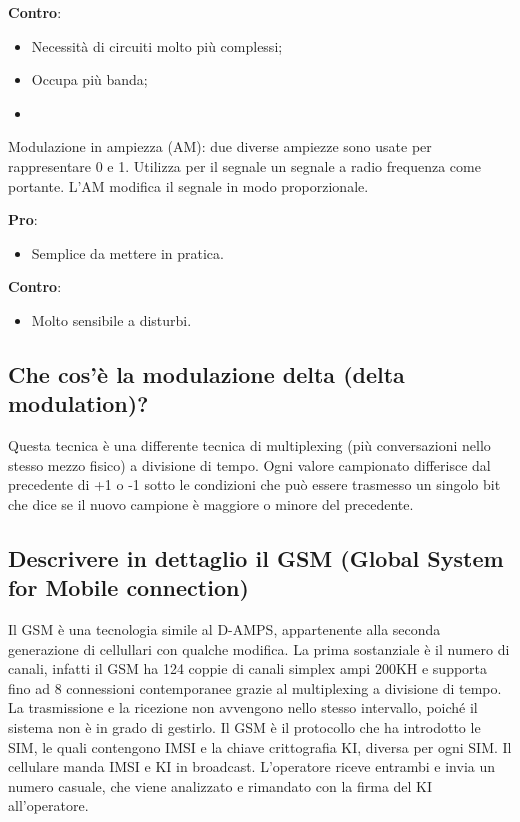 \textbf{Contro}:

\begin{itemize}

\item Necessità di circuiti molto più complessi;
\item Occupa più banda;
\item 

\end{itemize}

Modulazione in ampiezza (AM): due diverse ampiezze sono usate per rappresentare 0 e 1. Utilizza
per il segnale un segnale a radio frequenza come portante. L’AM modifica il segnale in modo
proporzionale.

\textbf{Pro}:

\begin{itemize}

\item Semplice da mettere in pratica.

\end{itemize}

\textbf{Contro}:

\begin{itemize}

\item Molto sensibile a disturbi.

\end{itemize}

\subsection{Che cos'è la modulazione delta (delta modulation)?}

Questa tecnica è una differente tecnica di multiplexing (più conversazioni nello stesso mezzo fisico)
a divisione di tempo. Ogni valore campionato differisce dal precedente di +1 o -1 sotto le condizioni
che può essere trasmesso un singolo bit che dice se il nuovo campione è maggiore o minore del
precedente.

\subsection{Descrivere in dettaglio il GSM (Global System for Mobile connection)}

Il GSM è una tecnologia simile al D-AMPS, appartenente alla seconda generazione di cellullari con
qualche modifica. La prima sostanziale è il numero di canali, infatti il GSM ha 124 coppie di canali
simplex ampi 200KH e supporta fino ad 8 connessioni contemporanee grazie al multiplexing a
divisione di tempo. La trasmissione e la ricezione non avvengono nello stesso intervallo, poiché il
sistema non è in grado di gestirlo. Il GSM è il protocollo che ha introdotto le SIM, le quali
contengono IMSI e la chiave crittografia KI, diversa per ogni SIM. Il cellulare manda IMSI e KI in
broadcast. L'operatore riceve entrambi e invia un numero casuale, che viene analizzato e
rimandato con la firma del KI all'operatore.

